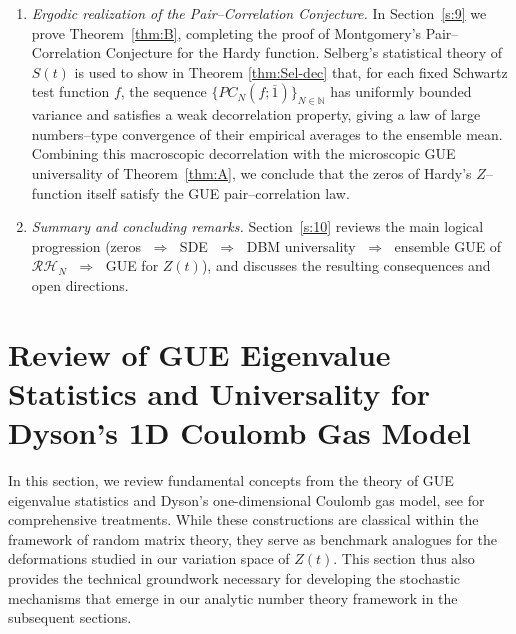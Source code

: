\documentclass[12pt,reqno]{amsart}
\theoremstyle{plain}
\theoremstyle{definition}
\theoremstyle{remark}
\begin{document}
\begin{enumerate}
\item \emph{Ergodic realization of the Pair--Correlation Conjecture.} 
In Section~\ref{s:9} we prove
Theorem~\ref{thm:B}, completing the proof of Montgomery’s Pair–Correlation Conjecture
for the Hardy function. Selberg’s statistical theory
of $S(t)$ is used to show in Theorem \ref{thm:Sel-dec} that, for each fixed Schwartz test function $f$, the
sequence $\{PC_N(f;\overline{1})\}_{N\in\mathbb{N}}$ has uniformly bounded variance and
satisfies a weak decorrelation property, giving a law of large numbers–type
convergence of their empirical averages to the ensemble mean. Combining this
macroscopic decorrelation with the microscopic GUE universality of
Theorem~\ref{thm:A}, we conclude that the zeros of Hardy’s $Z$–function itself
satisfy the GUE pair–correlation law.


 
 \item \emph{Summary and concluding remarks.} 
Section~\ref{s:10} reviews the main logical progression 
(zeros $\;\Rightarrow\;$ SDE $\;\Rightarrow\;$ DBM universality 
$\;\Rightarrow\;$ ensemble GUE of $\mathcal{RH}_N$ 
$\;\Rightarrow\;$ GUE for $Z(t)$), 
and discusses the resulting consequences and open directions.
\end{enumerate}

\section{Review of GUE Eigenvalue Statistics and Universality for Dyson's 1D Coulomb Gas Model}
\label{s:2} 

In this section, we review fundamental concepts from the theory of GUE eigenvalue statistics and Dyson's one-dimensional Coulomb gas model, see \cite{M,Dyson,PB,AGZ} for comprehensive treatments. While these constructions are classical within the framework of random matrix theory, they serve as benchmark analogues for the deformations studied in our variation space of \( Z(t) \). This section thus also provides the technical groundwork necessary for developing the stochastic mechanisms that emerge in our analytic number theory framework in the subsequent sections.
\end{document}
